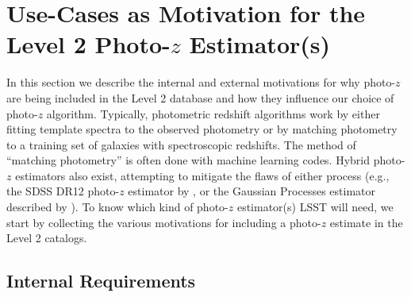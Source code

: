 \documentclass[DM,lsstdraft,toc]{lsstdoc}
\begin{document}
\section{Use-Cases as Motivation for the Level 2 Photo-$z$ Estimator(s)}\label{sec:motivation}

In this section we describe the internal and external motivations for why photo-$z$ are being included in the Level 2 database and how they influence our choice of photo-$z$ algorithm. Typically, photometric redshift algorithms work by either fitting template spectra to the observed photometry or by matching photometry to a training set of galaxies with spectroscopic redshifts. The method of ``matching photometry'' is often done with machine learning codes. Hybrid photo-$z$ estimators also exist, attempting to mitigate the flaws of either process (e.g., the SDSS DR12 photo-$z$ estimator by \citealt{2016MNRAS.460.1371B}, or the Gaussian Processes estimator described by \citealt{2017ApJ...838....5L}). To know which kind of photo-$z$ estimator(s) LSST will need, we start by collecting the various motivations for including a photo-$z$ estimate in the Level 2 catalogs.

\subsection{Internal Requirements}\label{ssec:motivation_internal}
\end{document}
